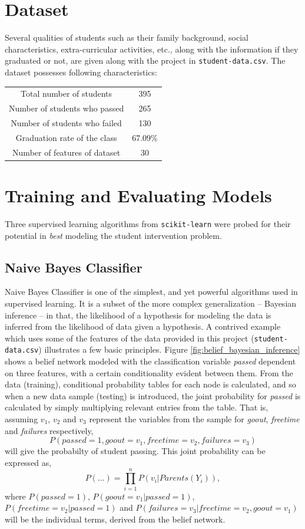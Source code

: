 \documentclass{article}
\begin{document}
	\section{Dataset}
	Several qualities of students such as their family background, social characteristics, extra-curricular activities, etc., along with the information if they graduated or not, are given along with the project in \texttt{student-data.csv}. The dataset possesses following characteristics:
	\begin{center}
		\begin{tabular}{c|c}
			\toprule
			Total number of students & 395 \\
			Number of students who passed & 265 \\
			Number of students who failed & 130  \\
			Graduation rate of the class & 67.09\% \\
			Number of features of dataset & 30 \\
			\bottomrule
		\end{tabular}
		\label{tab:data_characteristics}
	\end{center}
	
	
	\section{Training and Evaluating Models}
	Three supervised learning algorithms from \texttt{scikit-learn} were probed for their potential in \emph{best} modeling the student intervention problem. 
	
	\subsection{Naive Bayes Classifier}
	Naive Bayes Classifier is one of the simplest, and yet powerful algorithms used in supervised learning. It is a subset of the more complex generalization -- Bayesian inference -- in that, the likelihood of a hypothesis for modeling the data is inferred from the likelihood of data given a hypothesis. A contrived example which uses some of the features of the data provided in this project (\texttt{student-data.csv}) illustrates a few basic principles. Figure \ref{fig:belief_bayesian_inference} shows a belief network modeled with the classification variable \emph{passed} dependent on three features, with a certain conditionality evident between them. From the data (training), conditional probability tables for each node is calculated, and so when a new data sample (testing) is introduced, the joint probability for \emph{passed} is calculated by simply multiplying relevant entries from the table. That is, assuming $v_1$, $v_2$ and $v_3$ represent the variables from the sample for \emph{goout}, \emph{freetime} and \emph{failures} respectively, 
	\[P(passed=1, goout=v_1, freetime=v_2, failures=v_3)\] will give the probabilty of student passing. This joint probability can be expressed as, \[P(...) = \prod_{i=1}^{n}P(v_i|Parents(Y_i)),\] where $P(passed=1)$, $P(goout=v_1|passed=1)$, $P(freetime=v_2|passed=1)$ and $P(failures=v_3|freetime=v_2,goout=v_1)$ will be the individual terms, derived from the belief network.
	
\end{document}
